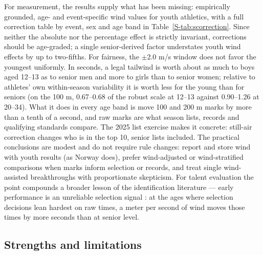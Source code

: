 \documentclass[12pt,a4paper]{article}
\begin{document}
For measurement, the results supply what has been missing: empirically grounded, age- and event-specific wind values for youth athletics, with a full correction table by event, sex and age band in Table~\ref{S-tab:scorrection}. Since neither the absolute nor the percentage effect is strictly invariant, corrections should be age-graded; a single senior-derived factor understates youth wind effects by up to two-fifths. For fairness, the $\pm$2.0 m/s window does not favor the youngest uniformly. In seconds, a legal tailwind is worth about as much to boys aged 12--13 as to senior men and more to girls than to senior women; relative to athletes' own within-season variability it is worth less for the young than for seniors (on the 100 m, 0.67--0.68 of the robust scale at 12--13 against 0.90--1.26 at 20--34). What it does in every age band is move 100 and 200 m marks by more than a tenth of a second, and raw marks are what season lists, records and qualifying standards compare. The 2025 list exercise makes it concrete: still-air correction changes who is in the top 10, senior lists included. The practical conclusions are modest and do not require rule changes: report and store wind with youth results (as Norway does), prefer wind-adjusted or wind-stratified comparisons when marks inform selection or records, and treat single wind-assisted breakthroughs with proportionate skepticism. For talent evaluation the point compounds a broader lesson of the identification literature --- early performance is an unreliable selection signal \citep{vaeyens2008,guttormsen2026development}: at the ages where selection decisions lean hardest on raw times, a meter per second of wind moves those times by more seconds than at senior level.

\subsection{Strengths and limitations}
\end{document}
